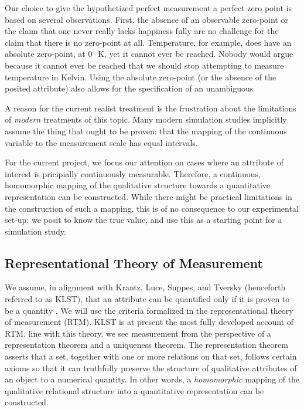 \documentclass[utf8]{FrontiersinVancouver}
\begin{document}
Our choice to give the hypothetized perfect measurement a perfect zero point is based on several observations. First, the absence of an observable zero-point or the claim that one never really lacks happiness fully are no challenge for the claim that there is no zero-point at all. Temperature, for example, does have an absolute zero-point, at 0$^\circ$ K, yet it cannot ever be reached. Nobody would argue because it cannot ever be reached that we should stop attempting to measure temperature in Kelvin. Using the absolute zero-point (or the absence of the posited attribute) also allows for the specification of an unambiguous 

A reason for the current realist treatment is the frustration about the limitations of \textit{modern} treatments of this topic. Many modern simulation studies implicitly assume the thing that ought to be proven: that the mapping of the continuous variable to the measurement scale has equal intervals. 


For the current project, we focus our attention on cases where an attribute of interest is pricipially continuously measurable. Therefore, a continuous, homomorphic mapping of the qualitative structure towards a quantitative representation can be constructed. While there might be practical limitations in the construction of such a mapping, this is of no consequence to our experimental set-up: we posit to know the true value, and use this as a starting point for a simulation study.

\subsection{Representational Theory of Measurement}
We assume, in alignment with Krantz, Luce, Suppes, and Tversky (henceforth referred to as KLST), that an attribute can be quantified only if it is proven to be a quantity \citep{michellMeasurementPsychologyCritical1999}. We will use the criteria formalized in the representational theory of measurement (RTM). KLST is at present the most fully developed account of RTM. \@In line with this theory, we see measurement from the perspective of a representation theorem and a uniqueness theorem. The representation theorem asserts that a set, together with one or more relations on that set, follows certain axioms so that it can truthfully preserve the structure of qualitative attributes of an object to a numerical quantity. In other words, a \textit{homomorphic} mapping of the qualitative relational structure into a quantitative representation can be constructed. 
\end{document}
